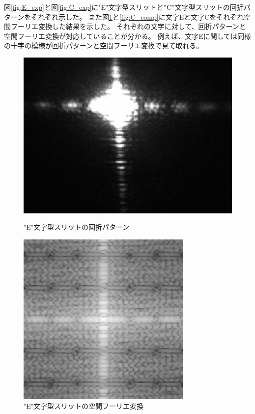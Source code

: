 \documentclass[11pt,a4]{jarticle}
\begin{document}
図\ref{fig:E_exp}と図\ref{fig:C_exp}に"E"文字型スリットと”C”文字型スリットの回折パターンをそれぞれ示した。
また図\ref{fig:E_comp}と\ref{fig:C_comp}に文字Eと文字Cをそれぞれ空間フーリエ変換した結果を示した。
それぞれの文字に対して、回折パターンと空間フーリエ変換が対応していることが分かる。
例えば、文字Eに関しては同様の十字の模様が回折パターンと空間フーリエ変換で見て取れる。
\begin{figure}[htbp]
 \begin{minipage}{0.55\hsize}
   \begin{center}
    \includegraphics[width=0.9\hsize]{./E_exp.eps}
    \caption{"E"文字型スリットの回折パターン}
     \label{fig:E_exp}
   \end{center}
 \end{minipage}
 \begin{minipage}{0.45\hsize}
   \begin{center}
    \includegraphics[width=0.9\hsize]{./E_comp.eps}
    \caption{"E"文字型スリットの空間フーリエ変換}
     \label{fig:E_comp}
   \end{center}
 \end{minipage}
\end{figure}
\end{document}

